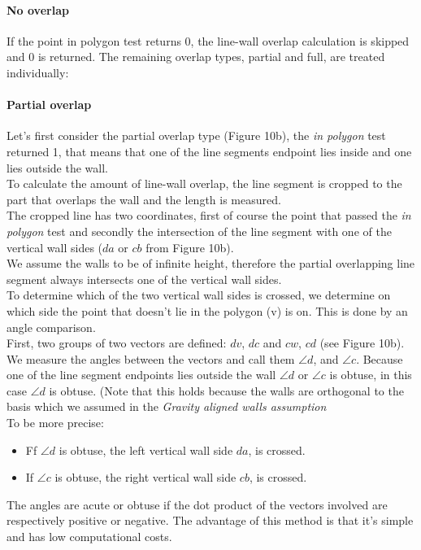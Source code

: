 	\paragraph{No overlap}
	If the point in polygon test returns 0, the line-wall overlap calculation
	is skipped and 0 is returned. The remaining overlap types, partial and full,
	are treated individually:\\


	\paragraph{Partial overlap}
	Let's first consider the partial overlap type (Figure 10b), the \emph{in polygon} test
	returned 1, that means that one of the line segments endpoint lies inside
	and one lies outside the wall.\\
	To calculate the amount of line-wall overlap, the line segment is cropped to the
	part that overlaps the wall and the length is measured.\\
	The cropped line has two coordinates, first of course the point that passed
	the \emph{in polygon} test and secondly the intersection of the line
	segment with one of the vertical wall sides ($da$ or $cb$ from Figure 10b).\\
	We assume the walls to be of infinite height, therefore the 
	partial overlapping line segment always intersects one of the
	vertical wall sides.\\
	To determine which of the two vertical wall sides is crossed, we determine
	on which side the point that doesn't lie in the polygon (v) is on.  This is
	done by an angle comparison.\\
	First, two groups of two vectors are defined: $dv$, $dc$ and $cw$, $cd$ (see Figure 10b).
	We measure the angles between the vectors and call them $\angle d$, and
	$\angle c$. 
	Because one of the line segment endpoints lies outside
	the wall $\angle d$ or $\angle c$ is obtuse, in this case $\angle d$ is obtuse.
	(Note that this holds because the walls are orthogonal to the basis
	which we assumed in the \emph{Gravity aligned walls assumption}\\
	To be more precise: 
	\begin{itemize}
	\item Ff $\angle d$ is obtuse, the left vertical wall side $da$, is
	crossed. \\
	\item If $\angle c$ is obtuse, the right vertical wall side $cb$, is
	crossed. \\
	\end{itemize}
	The angles are acute or obtuse if the dot product of the vectors involved
	are respectively positive or negative. The advantage of this method is that
	it's simple and has low computational costs.\\
	
